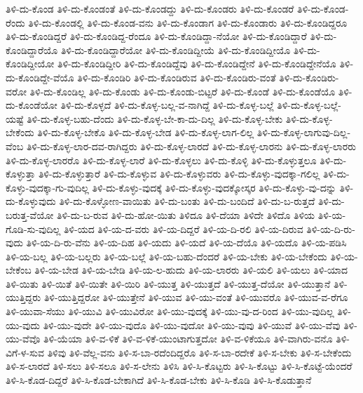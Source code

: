 {ತಿಳಿ-ದು-ಕೊಂಡ
ತಿಳಿ-ದು-ಕೊಂಡಂತೆ
ತಿಳಿ-ದು-ಕೊಂಡದ್ದು
ತಿಳಿ-ದು-ಕೊಂಡರು
ತಿಳಿ-ದು-ಕೊಂಡರೆ
ತಿಳಿ-ದು-ಕೊಂಡ-ರೆಂದು
ತಿಳಿ-ದು-ಕೊಂಡಲ್ಲಿ
ತಿಳಿ-ದು-ಕೊಂಡ-ವನು
ತಿಳಿ-ದು-ಕೊಂಡಾಗ
ತಿಳಿ-ದು-ಕೊಂಡಾರು
ತಿಳಿ-ದು-ಕೊಂಡಿದ್ದರೂ
ತಿಳಿ-ದು-ಕೊಂಡಿದ್ದರೆ
ತಿಳಿ-ದು-ಕೊಂಡಿದ್ದ-ರೆಂದೂ
ತಿಳಿ-ದು-ಕೊಂಡಿದ್ದಾ-ನೆಯೋ
ತಿಳಿ-ದು-ಕೊಂಡಿದ್ದಾರೆ
ತಿಳಿ-ದು-ಕೊಂಡಿದ್ದಾರೆಯೊ
ತಿಳಿ-ದು-ಕೊಂಡಿದ್ದಾರೆಯೋ
ತಿಳಿ-ದು-ಕೊಂಡಿದ್ದೀಯೆ
ತಿಳಿ-ದು-ಕೊಂಡಿದ್ದೀಯೊ
ತಿಳಿ-ದು-ಕೊಂಡಿದ್ದೀಯೋ
ತಿಳಿ-ದು-ಕೊಂಡಿದ್ದೀರಿ
ತಿಳಿ-ದು-ಕೊಂಡಿದ್ದೆವು
ತಿಳಿ-ದು-ಕೊಂಡಿದ್ದೇನೆ
ತಿಳಿ-ದು-ಕೊಂಡಿದ್ದೇನೆಯೊ
ತಿಳಿ-ದು-ಕೊಂಡಿದ್ದೇ-ವೆಯೊ
ತಿಳಿ-ದು-ಕೊಂಡಿರಿ
ತಿಳಿ-ದು-ಕೊಂಡಿರುವ
ತಿಳಿ-ದು-ಕೊಂಡಿರು-ವಂತೆ
ತಿಳಿ-ದು-ಕೊಂಡಿರು-ವರೋ
ತಿಳಿ-ದು-ಕೊಂಡಿಲ್ಲ
ತಿಳಿ-ದು-ಕೊಂಡು
ತಿಳಿ-ದು-ಕೊಂಡು-ಬಿಟ್ಟರೆ
ತಿಳಿ-ದು-ಕೊಂಡೆ
ತಿಳಿ-ದು-ಕೊಂಡೆಯೊ
ತಿಳಿ-ದು-ಕೊಂಡೆಯೋ
ತಿಳಿ-ದು-ಕೊಳ್ಳದೆ
ತಿಳಿ-ದು-ಕೊಳ್ಳ-ಬಲ್ಲ-ವ-ನಾಗಿದ್ದೆ
ತಿಳಿ-ದು-ಕೊಳ್ಳ-ಬಲ್ಲೆ
ತಿಳಿ-ದು-ಕೊಳ್ಳ-ಬಲ್ಲೆ-ಯಷ್ಟೆ
ತಿಳಿ-ದು-ಕೊಳ್ಳ-ಬಹು-ದೆಂದು
ತಿಳಿ-ದು-ಕೊಳ್ಳ-ಬೇ-ಕಾ-ದು-ದಿಲ್ಲ
ತಿಳಿ-ದು-ಕೊಳ್ಳ-ಬೇಕು
ತಿಳಿ-ದು-ಕೊಳ್ಳ-ಬೇಕೆಂದು
ತಿಳಿ-ದು-ಕೊಳ್ಳ-ಬೇಕೊ
ತಿಳಿ-ದು-ಕೊಳ್ಳ-ಬೇಡ
ತಿಳಿ-ದು-ಕೊಳ್ಳ-ಲಾಗ-ಲಿಲ್ಲ
ತಿಳಿ-ದು-ಕೊಳ್ಳ-ಲಾಗುವು-ದಿಲ್ಲ-ವೆಂಬ
ತಿಳಿ-ದು-ಕೊಳ್ಳ-ಲಾರ-ದವ-ರಾಗಿದ್ದರು
ತಿಳಿ-ದು-ಕೊಳ್ಳ-ಲಾರದೆ
ತಿಳಿ-ದು-ಕೊಳ್ಳ-ಲಾರನು
ತಿಳಿ-ದು-ಕೊಳ್ಳ-ಲಾರರು
ತಿಳಿ-ದು-ಕೊಳ್ಳ-ಲಾರರೊ
ತಿಳಿ-ದು-ಕೊಳ್ಳ-ಲಾರೆ
ತಿಳಿ-ದು-ಕೊಳ್ಳಲು
ತಿಳಿ-ದು-ಕೊಳ್ಳಿ
ತಿಳಿ-ದು-ಕೊಳ್ಳುತ್ತಲೂ
ತಿಳಿ-ದು-ಕೊಳ್ಳುತ್ತಾ
ತಿಳಿ-ದು-ಕೊಳ್ಳುತ್ತಾರೆ
ತಿಳಿ-ದು-ಕೊಳ್ಳುವ
ತಿಳಿ-ದು-ಕೊಳ್ಳುವರು
ತಿಳಿ-ದು-ಕೊಳ್ಳು-ವುದಕ್ಕಾ-ಗಲಿಲ್ಲ
ತಿಳಿ-ದು-ಕೊಳ್ಳು-ವುದಕ್ಕಾ-ಗು-ವುದಿಲ್ಲ
ತಿಳಿ-ದು-ಕೊಳ್ಳು-ವುದಕ್ಕೆ
ತಿಳಿ-ದು-ಕೊಳ್ಳು-ವುದಕ್ಕೋಸ್ಕರ
ತಿಳಿ-ದು-ಕೊಳ್ಳು-ವು-ದನ್ನು
ತಿಳಿ-ದು-ಕೊಳ್ಳುವುದು
ತಿಳಿ-ದು-ಕೊಳ್ಳೋಣ-ವಾಯಿತು
ತಿಳಿ-ದು-ಬಂತು
ತಿಳಿ-ದು-ಬಂದಿದೆ
ತಿಳಿ-ದು-ಬ-ರುತ್ತದೆ
ತಿಳಿ-ದು-ಬರುತ್ತ-ವೆಯೋ
ತಿಳಿ-ದು-ಬ-ರುವ
ತಿಳಿ-ದು-ಹೋ-ಯಿತು
ತಿಳಿದೂ
ತಿಳಿ-ದೆಯಾ
ತಿಳಿದೇ
ತಿಳಿದೊ
ತಿಳಿಯ
ತಿಳಿ-ಯ-ಗೊಡಿ-ಸು-ವುದಿಲ್ಲ
ತಿಳಿ-ಯದ
ತಿಳಿ-ಯ-ದ-ವರು
ತಿಳಿ-ಯ-ದಿದ್ದರೆ
ತಿಳಿ-ಯ-ದಿ-ರಲಿ
ತಿಳಿ-ಯ-ದಿರುವ
ತಿಳಿ-ಯ-ದಿ-ರು-ವುದು
ತಿಳಿ-ಯ-ದಿ-ರು-ವೆನು
ತಿಳಿ-ಯ-ದಿಹ
ತಿಳಿ-ಯದು
ತಿಳಿ-ಯದೆ
ತಿಳಿ-ಯ-ದೆಯೊ
ತಿಳಿ-ಯದೊ
ತಿಳಿ-ಯ-ಪಡಿಸಿ
ತಿಳಿ-ಯ-ಬಲ್ಲ
ತಿಳಿ-ಯ-ಬಲ್ಲರು
ತಿಳಿ-ಯ-ಬಲ್ಲೆ
ತಿಳಿ-ಯ-ಬಹು-ದೆಂದರೆ
ತಿಳಿ-ಯ-ಬೇಕು
ತಿಳಿ-ಯ-ಬೇಕೆಂದು
ತಿಳಿ-ಯ-ಬೇಕೆಂಬ
ತಿಳಿ-ಯ-ಬೇಡ
ತಿಳಿ-ಯ-ಬೇಡಿ
ತಿಳಿ-ಯ-ಲ-ಹುದು
ತಿಳಿ-ಯ-ಲಾರರು
ತಿಳಿ-ಯಲಿ
ತಿಳಿ-ಯಲು
ತಿಳಿ-ಯಾದ
ತಿಳಿ-ಯಿತು
ತಿಳಿ-ಯಿತೆ
ತಿಳಿ-ಯಿತೇ
ತಿಳಿ-ಯಿರಿ
ತಿಳಿ-ಯುತ್ತ
ತಿಳಿ-ಯುತ್ತದೆ
ತಿಳಿ-ಯುತ್ತ-ದೆಯೋ
ತಿಳಿ-ಯುತ್ತಾನೆ
ತಿಳಿ-ಯುತ್ತಿದ್ದರು
ತಿಳಿ-ಯುತ್ತಿದ್ದರೋ
ತಿಳಿ-ಯುತ್ತೇನೆ
ತಿಳಿ-ಯುವ
ತಿಳಿ-ಯು-ವಂತೆ
ತಿಳಿ-ಯುವರೊ
ತಿಳಿ-ಯುವ-ವ-ರೆಗೂ
ತಿಳಿ-ಯುವಾ-ಸೆಯು
ತಿಳಿ-ಯುವಿ
ತಿಳಿ-ಯುವಿರೋ
ತಿಳಿ-ಯು-ವುದಕ್ಕೆ
ತಿಳಿ-ಯು-ವು-ದ-ರಿಂದ
ತಿಳಿ-ಯು-ವುದಿಲ್ಲ
ತಿಳಿ-ಯು-ವುದು
ತಿಳಿ-ಯು-ವುದೇ
ತಿಳಿ-ಯು-ವುದೊ
ತಿಳಿ-ಯು-ವುದೋ
ತಿಳಿ-ಯು-ವುವು
ತಿಳಿ-ಯುವೆ
ತಿಳಿ-ಯು-ವೆವು
ತಿಳಿ-ಯು-ವೆವೊ
ತಿಳಿ-ಯೆಯಾ
ತಿಳಿ-ವ-ಳಿಕೆ
ತಿಳಿ-ವ-ಳಿಕೆ-ಯುಂಟಾಗುತ್ತದೋ
ತಿಳಿ-ವ-ಳಿಕೆಯೂ
ತಿಳಿ-ವಾಗಿರು-ವನೊ
ತಿಳಿ-ವಿಗೆ-ಳ-ಸುವ
ತಿಳಿವು
ತಿಳಿ-ವೆಲ್ಲ-ವನು
ತಿಳಿ-ಸ-ಬಾ-ರದೆಂದಿದ್ದರೊ
ತಿಳಿ-ಸ-ಬಾ-ರದೇಕೆ
ತಿಳಿ-ಸ-ಬೇಕು
ತಿಳಿ-ಸ-ಬೇಕೆಂದು
ತಿಳಿ-ಸ-ಲಾರದೆ
ತಿಳಿ-ಸಲು
ತಿಳಿ-ಸಲೂ
ತಿಳಿ-ಸ-ಲೇನು
ತಿಳಿಸಿ
ತಿಳಿ-ಸಿ-ಕೊಟ್ಟರು
ತಿಳಿ-ಸಿ-ಕೊಟ್ಟು
ತಿಳಿ-ಸಿ-ಕೊಟ್ಟೆ-ಯೆಂದರೆ
ತಿಳಿ-ಸಿ-ಕೊಡ-ದಿದ್ದರೆ
ತಿಳಿ-ಸಿ-ಕೊಡ-ಬೇಕಾಗಿದೆ
ತಿಳಿ-ಸಿ-ಕೊಡ-ಬೇಕು
ತಿಳಿ-ಸಿ-ಕೊಡಿ
ತಿಳಿ-ಸಿ-ಕೊಡುತ್ತಾನೆ
}
